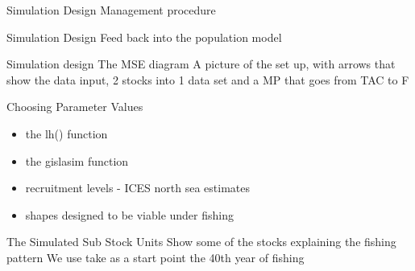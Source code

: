 \documentclass{beamer}
\begin{document}
\begin{withoutheadline}
\begin{frame}{Simulation Design}
  Management procedure
\end{frame}
\end{withoutheadline}


\begin{withoutheadline}
\begin{frame}{Simulation Design}
  Feed back into the population model
\end{frame}
\end{withoutheadline}


\begin{withoutheadline}
\begin{frame}{Simulation design}
  The MSE diagram
  A picture of the set up, with arrows that show the data input, 2 stocks into 1 data set and a MP that goes from TAC to F
\end{frame}
\end{withoutheadline}


\begin{withoutheadline}
\begin{frame}{Choosing Parameter Values}
  \begin{itemize}
    \item the lh() function
    \item the gislasim function
    \item recruitment levels - ICES north sea estimates
    \item shapes designed to be viable under fishing
  \end{itemize}  
\end{frame}
\end{withoutheadline}


\begin{withoutheadline}
\begin{frame}{The Simulated Sub Stock Units}
  Show some of the stocks explaining the fishing pattern
  We use take as a start point the 40th year of fishing
\end{frame}
\end{withoutheadline}
\end{document}
